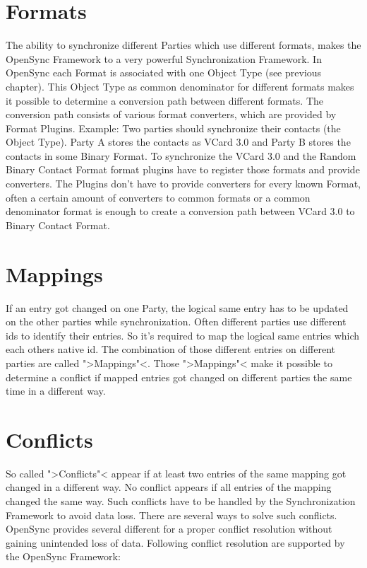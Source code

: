 \section{Formats}
The ability to synchronize different Parties which use different formats, makes
the OpenSync Framework to a very powerful Synchronization Framework. In OpenSync
each Format is associated with one Object Type (see previous chapter). This
Object Type as common denominator for different formats makes it possible to
determine a conversion path between different formats. The conversion path
consists of various format converters, which are provided by Format Plugins.
Example: Two parties should synchronize their contacts (the Object Type). Party
A stores the contacts as VCard 3.0 and Party B stores the contacts in some
Binary Format. To synchronize the VCard 3.0 and the Random Binary Contact Format
format plugins have to register those formats and provide converters. The
Plugins don't have to provide converters for every known Format, often a certain
amount of converters to common formats or a common denominator format is enough
to create a conversion path between VCard 3.0 to Binary Contact Format.
\section{Mappings}
If an entry got changed on one Party, the logical same entry has to be updated
on the other parties while synchronization. Often different parties use
different ids to identify their entries. So it's required to map the logical
same entries which each others native id. The combination of those different
entries on different parties are called ">Mappings"<. Those ">Mappings"< make it
possible to determine a conflict if mapped entries got changed on different
parties the same time in a different way.
\section{Conflicts}
So called ">Conflicts"< appear if at least two entries of the same mapping got
changed in a different way. No conflict appears if all entries of the mapping
changed the same way. Such conflicts have to be handled by the Synchronization
Framework to avoid data loss. There are several ways to solve such conflicts.
OpenSync provides several different for a proper conflict resolution without
gaining unintended loss of data. Following conflict resolution are supported by
the OpenSync Framework:

